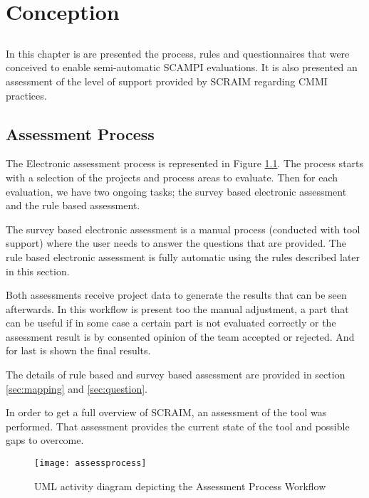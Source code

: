 \chapter{Conception} \label{chap:conception}

\section*{}

In this chapter is are presented the process, rules and questionnaires that were conceived to enable semi-automatic SCAMPI evaluations. It is also presented an assessment of the level of support provided by SCRAIM regarding CMMI practices.

\section{Assessment Process} \label{sec:Approach}

The Electronic assessment process is represented in Figure \ref{fig:assessmentprocess}.
The process starts with a selection of the projects and process areas to evaluate. Then for each evaluation, we have two ongoing tasks; the survey based electronic assessment and the rule based assessment.

The survey based electronic assessment is a manual process (conducted with tool support) where the user needs to answer the questions that are provided. The rule based electronic assessment is fully automatic using the rules described later in this section.

Both assessments receive project data to generate the results that can be seen afterwards. In this workflow is present too the manual adjustment, a part that can be useful if in some case a certain part is not evaluated correctly or the assessment result is by consented opinion of the team accepted or rejected. And for last is shown the final results. 

The details of rule based and survey based assessment are provided in section \ref{sec:mapping} and \ref{sec:question}.

In order to get a full overview of SCRAIM, an assessment of the tool was performed. That assessment provides the current state of the tool and possible gaps to overcome.

\newpage
	\begin{figure}[H]
		\begin{center}
			\leavevmode
			\texttt{[image: assessprocess]}
			\caption{UML activity diagram depicting the Assessment Process Workflow}
			\label{fig:assessmentprocess}
		\end{center}
	\end{figure}


